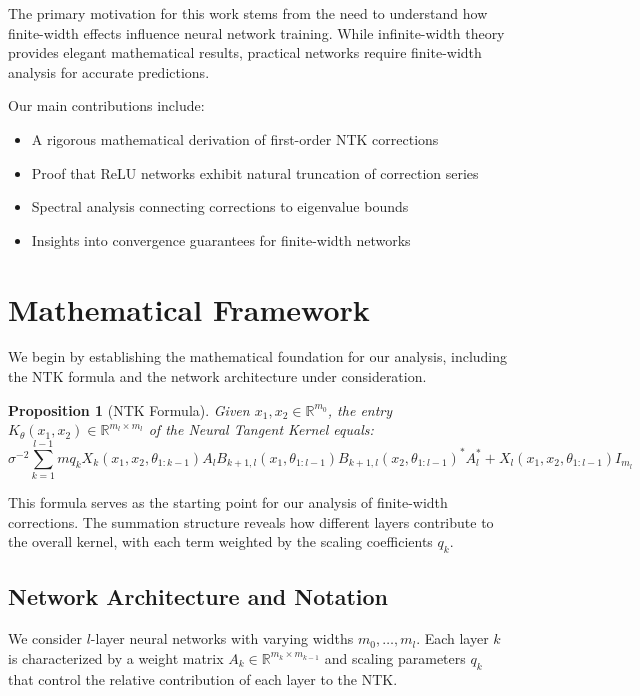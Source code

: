 \documentclass[11pt,a4paper]{article}
\newtheorem{proposition}[theorem]{Proposition}
\theoremstyle{definition}
\begin{document}
The primary motivation for this work stems from the need to understand how finite-width effects influence neural network training. While infinite-width theory provides elegant mathematical results, practical networks require finite-width analysis for accurate predictions.

Our main contributions include:
\begin{itemize}
\item A rigorous mathematical derivation of first-order NTK corrections
\item Proof that ReLU networks exhibit natural truncation of correction series
\item Spectral analysis connecting corrections to eigenvalue bounds
\item Insights into convergence guarantees for finite-width networks
\end{itemize}

\newpage

\section{Mathematical Framework}

We begin by establishing the mathematical foundation for our analysis, including the NTK formula and the network architecture under consideration.

\begin{proposition}[NTK Formula]\label{prop:ntk}
Given $x_1,x_2 \in \mathbb{R}^{m_0}$, the entry $K_\theta(x_1,x_2) \in \mathbb{R}^{m_l \times m_l}$ of the Neural Tangent Kernel equals:
\begin{equation}\label{eq:ntk_formula}
\sigma^{-2} \sum_{k=1}^{l-1} m q_k X_k(x_1,x_2,\theta_{1:k-1})A_l B_{k+1,l}(x_1,\theta_{1:l-1})B_{k+1,l}(x_2,\theta_{1:l-1})^*A_l^* + X_l(x_1,x_2,\theta_{1:l-1})I_{m_l}
\end{equation}
\end{proposition}

This formula serves as the starting point for our analysis of finite-width corrections. The summation structure reveals how different layers contribute to the overall kernel, with each term weighted by the scaling coefficients $q_k$.

\subsection{Network Architecture and Notation}

We consider $l$-layer neural networks with varying widths $m_0, \ldots, m_l$. Each layer $k$ is characterized by a weight matrix $A_k \in \mathbb{R}^{m_k \times m_{k-1}}$ and scaling parameters $q_k$ that control the relative contribution of each layer to the NTK.
\end{document}
